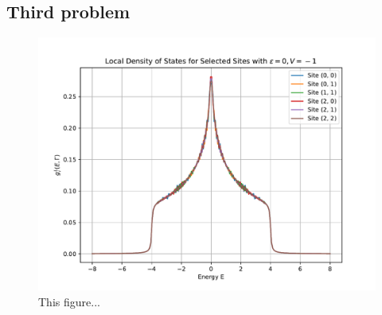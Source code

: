 \subsection{Third problem}

\begin{figure}[H]
    \centering    \includegraphics[width=\textwidth]{Figures/task3.pdf}
    \caption{This figure...}
    \label{fig:task3}
\end{figure}